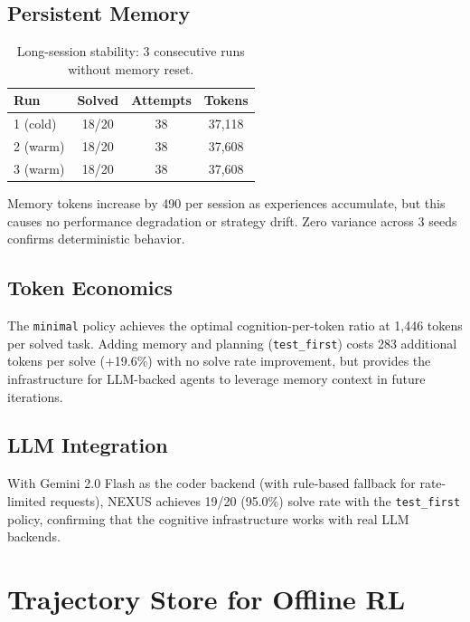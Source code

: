 \documentclass[11pt]{article}
\begin{document}
\subsection{Persistent Memory}
\label{sec:memory}

\begin{table}[h]
\centering
\caption{Long-session stability: 3 consecutive runs without memory reset.}
\label{tab:drift}
\begin{tabular}{lccc}
\toprule
\textbf{Run} & \textbf{Solved} & \textbf{Attempts} & \textbf{Tokens} \\
\midrule
1 (cold) & 18/20 & 38 & 37,118 \\
2 (warm) & 18/20 & 38 & 37,608 \\
3 (warm) & 18/20 & 38 & 37,608 \\
\bottomrule
\end{tabular}
\end{table}

Memory tokens increase by 490 per session as experiences accumulate,
but this causes no performance degradation or strategy drift.
Zero variance across 3 seeds confirms deterministic behavior.

\subsection{Token Economics}
\label{sec:economics}

The \texttt{minimal} policy achieves the optimal cognition-per-token ratio
at 1,446 tokens per solved task. Adding memory and planning
(\texttt{test\_first}) costs 283 additional tokens per solve (+19.6\%)
with no solve rate improvement, but provides the infrastructure for
LLM-backed agents to leverage memory context in future iterations.

\subsection{LLM Integration}
\label{sec:llm}

With Gemini 2.0 Flash as the coder backend (with rule-based fallback
for rate-limited requests), NEXUS achieves 19/20 (95.0\%) solve rate
with the \texttt{test\_first} policy, confirming that the cognitive
infrastructure works with real LLM backends.

\section{Trajectory Store for Offline RL}
\label{sec:trajectory}
\end{document}
